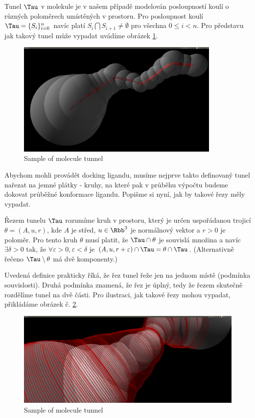 Tunel $ \Tau $ v molekule je v našem případě modelován posloupností koulí o různých poloměrech umístěných v prostoru. Pro posloupnost koulí $ \Tau = \{S_i\}_{i=0}^{n} $ navíc platí $ S_i \bigcap S_{i+1} \neq \emptyset $ pro všechna $ 0 \leq i < n $.
Pro představu jak takový tunel může vypadat uvádíme obrázek \ref{fig:basic_tunnel}.
\begin{figure}[ht]
  	\centering
	\includegraphics[width=100mm]{img/basic_tunnel.jpg}
	\caption{Sample of molecule tunnel}
  \centering
  \label{fig:basic_tunnel}
\end{figure}


Abychom mohli provádět docking ligandu, musíme nejprve takto definovaný tunel nařezat na jemné plátky - kruhy, na které pak v průběhu výpočtu budeme dokovat průběžné konformace ligandu. Popišme si nyní, jak by takové řezy měly vypadat.

\begin{defi}
Řezem tunelu $ \Tau $ rozumíme kruh v prostoru, který je určen uspořádanou trojicí $\theta = (A, u, r)$, kde $ A $ je střed, $ u \in \Rbb^3 $ je normálnový vektor a $ r > 0 $ je poloměr.
Pro tento kruh $ \theta $ musí platit, že $ \Tau \cap \theta $ je souvislá množina a navíc
$ \exists \delta > 0 $ tak, že $ \forall \varepsilon > 0,  \varepsilon < \delta $ je  $ (A, u, r + \varepsilon) \cap \Tau = \theta \cap \Tau $.
(Alternativně řečeno $\Tau \setminus \theta $ má dvě komponenty.)
\end{defi}

Uvedená definice prakticky říká, že řez tunel řeže jen na jednom místě (podmínka souvislosti). Druhá podmínka znamená, že řez je úplný, tedy že řezem skutečně rozdělíme tunel na dvě části.
Pro ilustraci, jak takové řezy mohou vypadat, přikládáme obrázek č. \ref{fig:tunnel_cuts}.
\begin{figure}[ht]
    \centering
    \includegraphics[width=\textwidth]{img/simple_cuts.png}
    \caption{Sample of molecule tunnel}
  \centering
  \label{fig:tunnel_cuts}
\end{figure}

